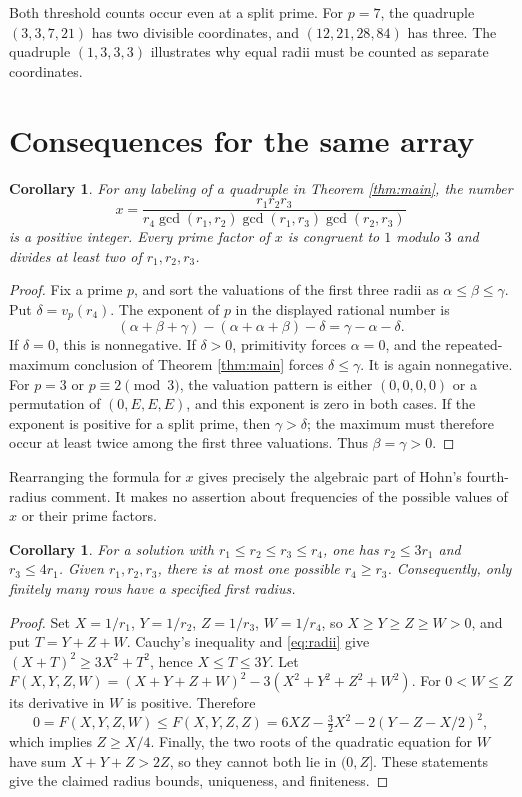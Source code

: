 \documentclass[11pt]{article}
\newtheorem{corollary}[theorem]{Corollary}
\begin{document}
Both threshold counts occur even at a split prime. For $p=7$, the
quadruple $(3,3,7,21)$ has two divisible coordinates, and
$(12,21,28,84)$ has three. The quadruple $(1,3,3,3)$ illustrates why
equal radii must be counted as separate coordinates.

\section{Consequences for the same array}
\begin{corollary}\label{cor:gcd}
For any labeling of a quadruple in Theorem \ref{thm:main}, the number
\[
 x=\frac{r_1r_2r_3}
 {r_4\gcd(r_1,r_2)\gcd(r_1,r_3)\gcd(r_2,r_3)}
\]
is a positive integer. Every prime factor of $x$ is congruent to $1$
modulo $3$ and divides at least two of $r_1,r_2,r_3$.
\end{corollary}
\begin{proof}
Fix a prime $p$, and sort the valuations of the first three radii as
$\alpha\le\beta\le\gamma$. Put $\delta=v_p(r_4)$. The exponent of
$p$ in the displayed rational number is
\[
 (\alpha+\beta+\gamma)
 -(\alpha+\alpha+\beta)-\delta=\gamma-\alpha-\delta.
\]
If $\delta=0$, this is nonnegative. If $\delta>0$, primitivity
forces $\alpha=0$, and the repeated-maximum conclusion of Theorem
\ref{thm:main} forces $\delta\le\gamma$. It is again nonnegative.
For $p=3$ or $p\equiv2\pmod3$, the valuation pattern is either
$(0,0,0,0)$ or a permutation of $(0,E,E,E)$, and this exponent is
zero in both cases. If the exponent is positive for a split prime, then
$\gamma>\delta$; the maximum must therefore occur at least twice
among the first three valuations. Thus $\beta=\gamma>0$.
\end{proof}

Rearranging the formula for $x$ gives precisely the algebraic part of Hohn's
fourth-radius comment. It makes no assertion about frequencies of the
possible values of $x$ or their prime factors.

\begin{corollary}\label{cor:bounds}
For a solution with $r_1\le r_2\le r_3\le r_4$, one has
$r_2\le3r_1$ and $r_3\le4r_1$. Given $r_1,r_2,r_3$, there is at most
one possible $r_4\ge r_3$. Consequently, only finitely many rows have a
specified first radius.
\end{corollary}
\begin{proof}
Set $X=1/r_1$, $Y=1/r_2$, $Z=1/r_3$, $W=1/r_4$, so
$X\ge Y\ge Z\ge W>0$, and put $T=Y+Z+W$. Cauchy's inequality and
\eqref{eq:radii} give
$(X+T)^2\ge3X^2+T^2$, hence $X\le T\le3Y$.
Let $F(X,Y,Z,W)=(X+Y+Z+W)^2-3(X^2+Y^2+Z^2+W^2)$.
For $0<W\le Z$ its derivative in $W$ is positive. Therefore
\[
 0=F(X,Y,Z,W)\le F(X,Y,Z,Z)
 =6XZ-\tfrac32X^2-2(Y-Z-X/2)^2,
\]
which implies $Z\ge X/4$. Finally, the two roots of the quadratic
equation for $W$ have sum $X+Y+Z>2Z$, so they cannot both lie in
$(0,Z]$. These statements give the claimed radius bounds, uniqueness,
and finiteness.
\end{proof}
\end{document}

